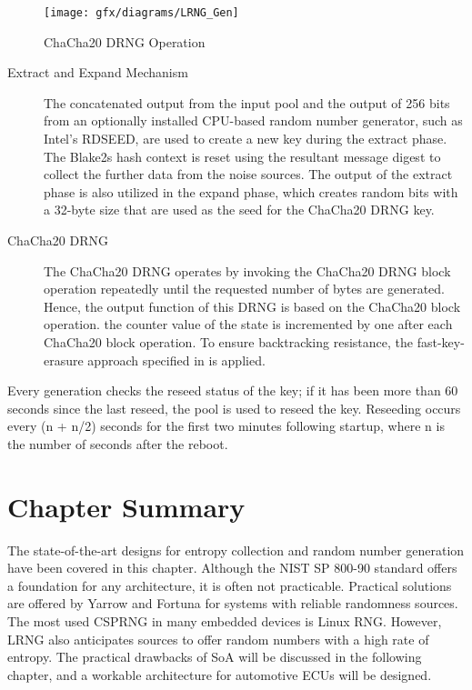 \begin{description}
	\begin{figure}[htbp]
		\centering
		\texttt{[image: gfx/diagrams/LRNG\_Gen]}
		\caption{ChaCha20 DRNG Operation}
		\label{fig:3:18}
	\end{figure}

	\begin{description}
		\item[Extract and Expand Mechanism] The concatenated output from the input pool and the output of 256 bits from an optionally installed CPU-based random number generator, such as Intel's RDSEED, are used to create a new key during the extract phase. The Blake2s hash context is reset using the resultant message digest to collect the further data from the noise sources. The output of the extract phase is also utilized in the expand phase, which creates random bits with a 32-byte size that are used as the seed for the ChaCha20 DRNG key.
		
		\item[ChaCha20 DRNG] The ChaCha20 DRNG operates by invoking the ChaCha20 DRNG block operation repeatedly until the requested number of bytes are generated. Hence, the output function of this DRNG is based on the ChaCha20 block operation. the counter value of the state is incremented by one after each ChaCha20 block operation. To ensure backtracking resistance, the fast-key-erasure approach specified in is applied.
	\end{description}
	
\end{description}

Every generation checks the reseed status of the key; if it has been more than 60 seconds since the last reseed, the pool is used to reseed the key. Reseeding occurs every (n + n/2) seconds for the first two minutes following startup, where n is the number of seconds after the reboot.

%
%
\section{Chapter Summary}
\label{sec:SoA:Summary}
The state-of-the-art designs for entropy collection and random number generation have been covered in this chapter. Although the NIST SP 800-90 standard offers a foundation for any architecture, it is often not practicable. Practical solutions are offered by Yarrow and Fortuna for systems with reliable randomness sources. The most used CSPRNG in many embedded devices is Linux RNG. However, LRNG also anticipates sources to offer random numbers with a high rate of entropy. The practical drawbacks of SoA will be discussed in the following chapter, and a workable architecture for automotive ECUs will be designed.